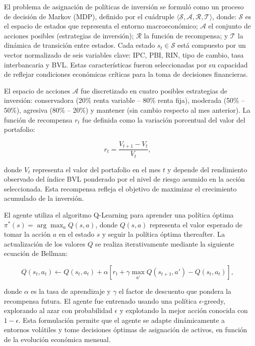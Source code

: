 \documentclass[conference]{IEEEtran}
\begin{document}
	El problema de asignación de políticas de inversión se formuló como un proceso de decisión de Markov (MDP), definido por el cuádruple $\langle \mathcal{S}, \mathcal{A}, \mathcal{R}, \mathcal{T} \rangle$, donde: $\mathcal{S}$ es el espacio de estados que representa el entorno macroeconómico; $\mathcal{A}$ el conjunto de acciones posibles (estrategias de inversión); $\mathcal{R}$ la función de recompensa; y $\mathcal{T}$ la dinámica de transición entre estados. Cada estado $s_t \in \mathcal{S}$ está compuesto por un vector normalizado de seis variables clave: IPC, PBI, RIN, tipo de cambio, tasa interbancaria y BVL. Estas características fueron seleccionadas por su capacidad de reflejar condiciones económicas críticas para la toma de decisiones financieras.
	
	El espacio de acciones $\mathcal{A}$ fue discretizado en cuatro posibles estrategias de inversión: conservadora (20\% renta variable – 80\% renta fija), moderada (50\% – 50\%), agresiva (80\% – 20\%) y mantener (sin cambio respecto al mes anterior). La función de recompensa $r_t$ fue definida como la variación porcentual del valor del portafolio:
	
	\[
	r_t = \frac{V_{t+1} - V_t}{V_t},
	\]
	
	donde $V_t$ representa el valor del portafolio en el mes $t$ y depende del rendimiento observado del índice BVL ponderado por el nivel de riesgo asumido en la acción seleccionada. Esta recompensa refleja el objetivo de maximizar el crecimiento acumulado de la inversión.
	
	El agente utiliza el algoritmo Q-Learning para aprender una política óptima $\pi^*(s) = \arg\max_a Q(s,a)$, donde $Q(s,a)$ representa el valor esperado de tomar la acción $a$ en el estado $s$ y seguir la política óptima thereafter. La actualización de los valores $Q$ se realiza iterativamente mediante la siguiente ecuación de Bellman:
	
	\[
	Q(s_t, a_t) \leftarrow Q(s_t, a_t) + \alpha \left[r_t + \gamma \max_{a'} Q(s_{t+1}, a') - Q(s_t, a_t)\right],
	\]
	
	donde $\alpha$ es la tasa de aprendizaje y $\gamma$ el factor de descuento que pondera la recompensa futura. El agente fue entrenado usando una política $\epsilon$-greedy, explorando al azar con probabilidad $\epsilon$ y explotando la mejor acción conocida con $1-\epsilon$. Esta formulación permite que el agente se adapte dinámicamente a entornos volátiles y tome decisiones óptimas de asignación de activos, en función de la evolución económica mensual.
	
\end{document}
